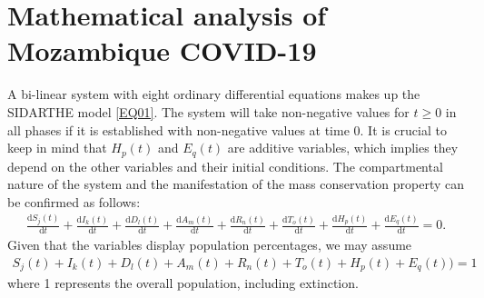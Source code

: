 \documentclass{article}
\begin{document}
\section{Mathematical analysis of Mozambique COVID-19}
A bi-linear system with eight ordinary differential equations makes up the SIDARTHE model \ref{EQ01}. The system will take non-negative values for $t \ge 0$ in all phases if it is established with non-negative values at time 0. It is crucial to keep in mind that $H_p(t)$ and $E_q(t)$ are additive variables, which implies they depend on the other variables and their initial conditions. The compartmental nature of the system and the manifestation of the mass conservation property can be confirmed as follows:
\begin{align*}
    \frac{\text{d}S_j(t)}{\text{d}t} + \frac{\text{d}I_k(t)}{\text{d}t} +\frac{\text{d}D_l(t)}{\text{d}t} +\frac{\text{d}A_m(t)}{\text{d}t} +\frac{\text{d}R_n(t)}{\text{d}t} +\frac{\text{d}T_o(t)}{\text{d}t} +\frac{\text{d}H_p(t)}{\text{d}t}+ \frac{\text{d}E_q(t)}{\text{d}t} =0.
\end{align*}
Given that the variables display population percentages, we may assume\\
\begin{align*}
    S_j(t)+ I_k(t)+ D_l(t)+ A_m(t)+ R_n(t)+ T_o(t)+ H_p(t)+ E_q(t))=1
\end{align*}
where 1 represents the overall population, including extinction.
\end{document}
